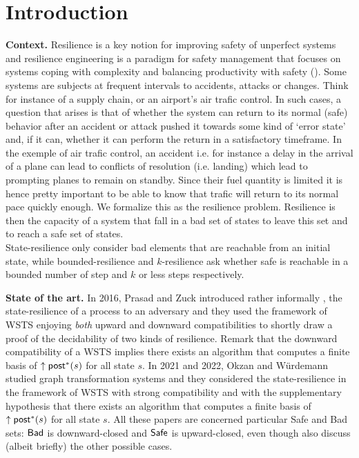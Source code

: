 \section{Introduction}\label{section introduction}


{\bf Context.} 
Resilience is a key notion for improving safety of unperfect systems and resilience engineering is a paradigm for safety management that focuses on systems coping with complexity and balancing productivity with safety (\cite{challenges}). Some systems are subjects at frequent intervals to accidents, attacks or changes. Think for instance of a supply chain, or an airport’s air trafic control. In such cases, a question that arises is that of whether the system can return to its normal (safe) behavior after an accident or attack
pushed it towards some kind of ‘error state’ and, if it can, whether it can perform the return in a satisfactory timeframe. 
In the exemple of air trafic control, an accident i.e. for instance a delay in the arrival of a plane can lead to conflicts of resolution (i.e. landing) which lead to prompting planes to remain on standby. Since their fuel quantity is limited it is hence pretty important to be able to know that trafic will return to its normal pace quickly enough. We formalize this as the resilience problem. 
Resilience is then the capacity of a system that fall in a bad set of states to leave this set and to reach a safe set of states. \\

State-resilience only consider bad elements that are reachable from an initial state, while bounded-resilience and $k$-resilience ask whether safe is reachable in a bounded number of step and $k$ or less steps respectively.

{\bf State of the art.} 
In 2016, Prasad and Zuck introduced rather informally \cite{DBLP:journals/corr/PrasadZ16}, the state-resilience of a process to an adversary and they used the framework of WSTS enjoying \emph{both} upward and downward compatibilities to shortly draw a proof of the decidability of two kinds of resilience. Remark that the downward compatibility of a WSTS implies  there exists an algorithm that computes a finite basis of $\uparrow \textsf{post}^*(s)$ for all state $s$. In 2021 and 2022, Okzan and Würdemann \cite{DBLP:journals/corr/abs-2108-00889,DBLP:conf/gg/Ozkan22} studied graph transformation systems and they considered the state-resilience in the framework of WSTS with strong compatibility and with the supplementary hypothesis that there exists an algorithm that computes a finite basis of $\uparrow \textsf{post}^*(s)$ for all state $s$. All these papers are concerned particular Safe and Bad sets: $\textsf{Bad}$ is downward-closed and $\textsf{Safe}$ is upward-closed,
even though \cite{DBLP:conf/gg/Ozkan22} also discuss (albeit briefly) the other possible cases.

